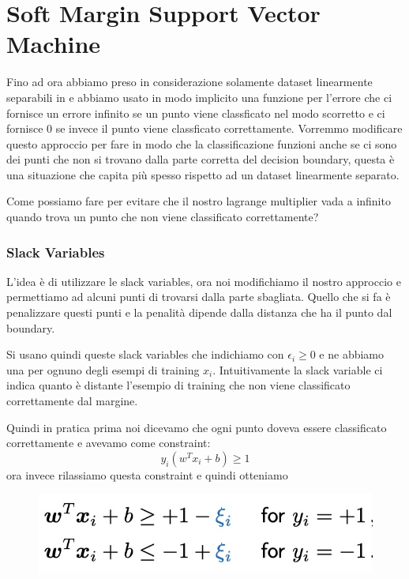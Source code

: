 \documentclass[14pt]{extreport}
\begin{document}
\section{Soft Margin Support Vector Machine}

Fino ad ora abbiamo preso in considerazione solamente dataset linearmente separabili in e abbiamo usato in modo implicito una funzione per l'errore
che ci fornisce un errore infinito se un punto viene classficato nel modo scorretto e ci fornisce 0 se invece il punto viene classficato
correttamente. Vorremmo modificare questo approccio per fare in modo che la classificazione funzioni anche se ci sono dei punti che non si trovano
dalla parte corretta del decision boundary, questa è una situazione che capita più spesso rispetto ad un dataset linearmente separato.

Come possiamo fare per evitare che il nostro lagrange multiplier vada a infinito quando trova un punto che non viene classificato correttamente?

\subsubsection{Slack Variables}

L'idea è di utilizzare le slack variables, ora noi modifichiamo il nostro approccio e permettiamo ad alcuni punti di trovarsi dalla parte sbagliata.
Quello che si fa è penalizzare questi punti e la penalità dipende dalla distanza che ha il punto dal boundary.

Si usano quindi queste slack variables che indichiamo con $\epsilon_i \geq 0$ e ne abbiamo una per ognuno degli esempi di training $x_i$.
Intuitivamente la slack variable ci indica quanto è distante l'esempio di training che non viene classificato correttamente dal margine.


Quindi in pratica prima noi dicevamo che ogni punto doveva essere classificato correttamente e avevamo come constraint: $$y_i(w^Tx_i+b) \geq 1$$ ora
invece rilassiamo questa constraint e quindi otteniamo

\begin{figure}[H]
	\centering
	\includegraphics[width=0.7\linewidth]{320.jpeg}
\end{figure}
\end{document}
